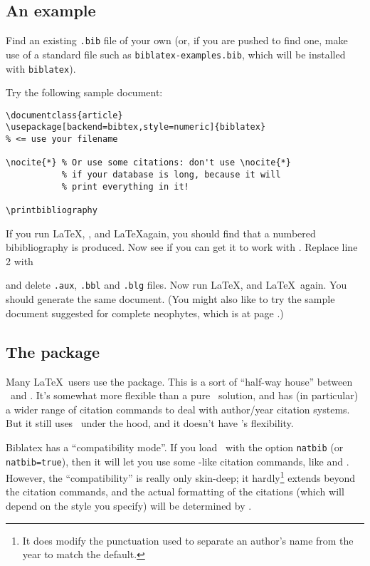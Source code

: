 \subsection{An example}

Find an existing \verb|.bib| file of your own (or, if you are pushed to find one, make use of a standard file such as \verb|biblatex-examples.bib|, which will be installed with \verb|biblatex|).

Try the following sample document:

\begin{verbatim}
\documentclass{article}
\usepackage[backend=bibtex,style=numeric]{biblatex}
% <= use your filename

\nocite{*} % Or use some citations: don't use \nocite{*}
           % if your database is long, because it will
           % print everything in it!

\printbibliography

\end{verbatim}

If you run \LaTeX, \bibtex, and \LaTeX again, you should find that a numbered bibibliography is produced. Now see if you can get it to work with . Replace line 2 with
\begin{center}
\end{center}
and delete \verb|.aux|, \verb|.bbl| and \verb|.blg| files. Now run \LaTeX,  and \LaTeX\ again. You should generate the same document. (You might also like to try the sample document suggested for complete neophytes, which is at page \pageref{neophyte:example}.)

\subsection{The  package}

Many \LaTeX\ users use the  package. This is a sort of ``half-way house'' between \bibtex\ and \biblatex. It's somewhat more flexible than a pure \bibtex\ solution, and has (in particular) a wider range of citation commands to deal with author\slash year citation systems. But it still uses \bibtex\ under the hood, and it doesn't have \biblatex's flexibility.

Biblatex has a  ``compatibility mode''. If you load \biblatex\ with the option \texttt{natbib} (or \texttt{natbib\allowbreak =\allowbreak true}), then it will let you use some -like citation commands, like  and . However, the ``compatibility'' is really only skin-deep; it hardly\footnote{It does modify the punctuation used to separate an author's name from the year to match the  default.} extends beyond the citation commands, and the actual formatting of the citations (which will depend on the style you specify) will be determined by \biblatex.
